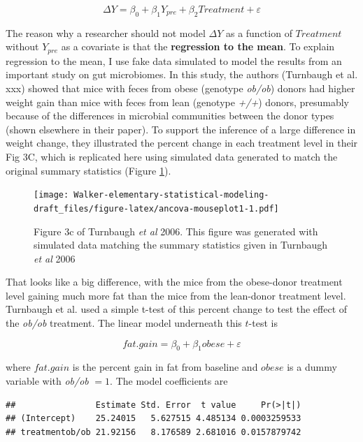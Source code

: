 \documentclass[]{book}
\begin{document}
\begin{equation}
\Delta Y = \beta_0 + \beta_1 Y_{pre} + \beta_2 Treatment + \varepsilon
\label{eq:ancova-5}
\end{equation}

The reason why a researcher should not model \(\Delta Y\) as a function
of \(Treatment\) without \(Y_{pre}\) as a covariate is that the
\textbf{regression to the mean}. To explain regression to the mean, I
use fake data simulated to model the results from an important study on
gut microbiomes. In this study, the authors (Turnbaugh et al. xxx)
showed that mice with feces from obese (genotype \emph{ob/ob}) donors
had higher weight gain than mice with feces from lean (genotype
\emph{+/+}) donors, presumably because of the differences in microbial
communities between the donor types (shown elsewhere in their paper). To
support the inference of a large difference in weight change, they
illustrated the percent change in each treatment level in their Fig 3C,
which is replicated here using simulated data generated to match the
original summary statistics (Figure \ref{fig:ancova-mouseplot1}).

\begin{figure}
\centering
\texttt{[image: Walker-elementary-statistical-modeling-draft\_files/figure-latex/ancova-mouseplot1-1.pdf]}
\caption{\label{fig:ancova-mouseplot1}Figure 3c of Turnbaugh \emph{et al}
2006. This figure was generated with simulated data matching the summary
statistics given in Turnbaugh \emph{et al} 2006}
\end{figure}

That looks like a big difference, with the mice from the obese-donor
treatment level gaining much more fat than the mice from the lean-donor
treatment level. Turnbaugh et al. used a simple t-test of this percent
change to test the effect of the \emph{ob/ob} treatment. The linear
model underneath this \(t\)-test is

\begin{equation}
fat.gain = \beta_0 + \beta_1 obese + \varepsilon
\end{equation}

where \(fat.gain\) is the percent gain in fat from baseline and
\(obese\) is a dummy variable with \emph{ob/ob} \(= 1\). The model
coefficients are

\begin{verbatim}
##                Estimate Std. Error  t value     Pr(>|t|)
## (Intercept)    25.24015   5.627515 4.485134 0.0003259533
## treatmentob/ob 21.92156   8.176589 2.681016 0.0157879742
\end{verbatim}
\end{document}
